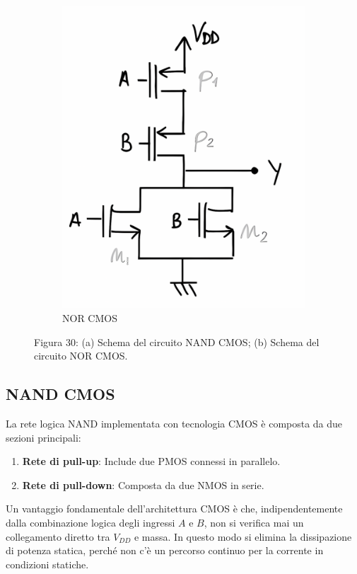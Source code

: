 \begin{figure}[H]
\begin{subfigure}[b]{0.45\textwidth}
      \includegraphics[width=\linewidth]{images/2.2.2.2.png}
      \caption{NOR CMOS}
  \end{subfigure}
  \caption{Figura 30: (a) Schema del circuito NAND CMOS; (b) Schema del circuito NOR CMOS.}
  \label{fig:fig30}
\end{figure}
\subsection{NAND CMOS}
La rete logica NAND implementata con tecnologia CMOS è composta da due sezioni principali:
\begin{enumerate}
  \item \textbf{Rete di pull-up}: Include due PMOS connessi in parallelo.
  \item \textbf{Rete di pull-down}: Composta da due NMOS in serie.
\end{enumerate}

Un vantaggio fondamentale dell'architettura CMOS è che, indipendentemente dalla combinazione logica degli ingressi \(A\) e \(B\), non si verifica mai un collegamento diretto tra \(V_{DD}\) e massa. In questo modo si elimina la dissipazione di potenza statica, perché non c'è un percorso continuo per la corrente in condizioni statiche.

